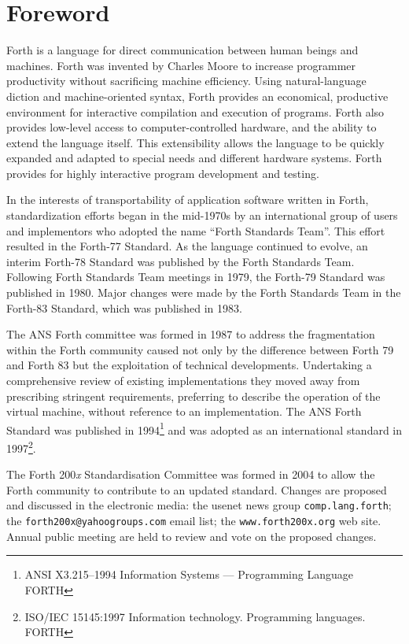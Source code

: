 
\vspace*{-6ex}\chapter*{Foreword}
\label{foreword}

Forth is a language for direct communication between human beings and
machines. Forth was invented by Charles Moore to increase programmer
productivity without sacrificing machine efficiency.
Using natural-language diction and machine-oriented syntax,
Forth provides an economical, productive environment for interactive
compilation and execution of programs. Forth also provides low-level
access to computer-controlled hardware, and the ability to extend the
language itself. This extensibility allows the language to be quickly
expanded and adapted to special needs and different hardware systems.
Forth provides for highly interactive program development and testing.

In the interests of transportability of application software written in
Forth, standardization efforts began in the mid-1970s by an international
group of users and implementors who adopted the name ``Forth Standards Team''.
This effort resulted in the Forth-77 Standard. As the language continued
to evolve, an interim Forth-78 Standard was published by the Forth Standards
Team. Following Forth Standards Team meetings in 1979, the Forth-79 Standard
was published in 1980. Major changes were made by the Forth Standards Team
in the Forth-83 Standard, which was published in 1983.

The ANS Forth committee was formed in 1987 to address the fragmentation
within the Forth community caused not only by the difference between
Forth 79 and Forth 83 but the exploitation of technical de\-vel\-op\-ments.
Undertaking a comprehensive review of existing implementations they
moved away from prescribing stringent requirements, preferring to
describe the operation of the virtual machine, without reference to
an implementation.  The ANS Forth Standard was published in
1994\footnote{ANSI X3.215--1994 Information Systems --- Programming Language FORTH}
and was adopted as an international standard in
1997\footnote{ISO/IEC 15145:1997 Information technology.  Programming languages.  FORTH}.

The Forth 200\emph{x} Standardisation Committee was formed in 2004
to allow the Forth community to contribute to an updated standard.
Changes are proposed and discussed in the electronic media:
the usenet news group \texttt{comp.lang.forth};
the \texttt{forth200x@yahoogroups.com} email list;
the \texttt{www.forth200x.org} web site.
Annual public meeting are held to review and vote on the proposed
changes.

